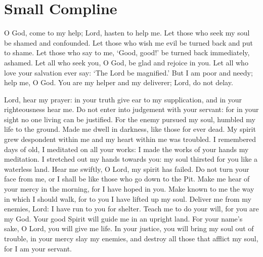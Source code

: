 \newpage
\section{Small Compline}

\throughtheprayers

\heavenlyking


\trisagion

\comeletusworship


\psalmfifty


O God, come to my help; Lord, hasten to help me. Let those who seek my soul be shamed and confounded. Let those who wish me evil be turned back and put to shame. Let those who say to me, `Good, good!' be turned back immediately, ashamed. Let all who seek you, O God, be glad and rejoice in you. Let all who love your salvation ever say: `The Lord be magnified.' But I am poor and needy; help me, O God. You are my helper and my deliverer; Lord, do not delay.


Lord, hear my prayer: in your truth give ear to my supplication, and in your righteousness hear me. Do not enter into judgement with your servant: for in your sight no one living can be justified. For the enemy pursued my soul, humbled my life to the ground. Made me dwell in darkness, like those for ever dead. My spirit grew despondent within me and my heart within me was troubled. I remembered days of old, I meditated on all your works: I made the works of your hands my meditation. I stretched out my hands towards you: my soul thirsted for you like a waterless land. Hear me swiftly, O Lord, my spirit has failed. Do not turn your face from me, or I shall be like those who go down to the Pit. Make me hear of your mercy in the morning, for I have hoped in you. Make known to me the way in which I should walk, for to you I have lifted up my soul. Deliver me from my enemies, Lord: I have run to you for shelter. Teach me to do your will, for you are my God. Your good Spirit will guide me in an upright land. For your name's sake, O Lord, you will give me life. In your justice, you will bring my soul out of trouble, in your mercy slay my enemies, and destroy all those that afflict my soul, for I am your servant.


